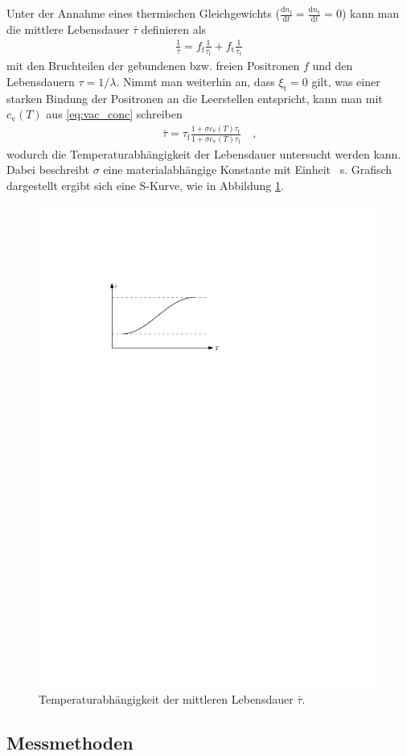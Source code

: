 \documentclass[11pt, a4paper]{article}
\numberwithin{equation}{section}
\begin{document}
Unter der Annahme eines thermischen Gleichgewichts ($\frac{\mathrm{d}n_\mathrm{f}}{\mathrm{d}t} = \frac{\mathrm{d}n_\mathrm{t}}{\mathrm{d}t} = 0$) kann man die mittlere Lebensdauer $\bar\tau$ definieren als
\begin{align}
	\frac{1}{\bar\tau}=f_\mathrm{f}\frac{1}{\tau_\mathrm{f}} + f_\mathrm{t}\frac{1}{\tau_\mathrm{t}}
\end{align}
mit den Bruchteilen der gebundenen bzw. freien Positronen $f$ und den Lebensdauern $\tau = 1/\lambda$.
Nimmt man weiterhin an, dass $\xi_\mathrm{t}=0$ gilt, was einer starken Bindung der Positronen an die Leerstellen entspricht, kann man mit $c_\mathrm{v}(T)$ aus \eqref{eq:vac_conc} schreiben
\begin{align}
	\bar\tau=\tau_\mathrm{f}\frac{1+\sigma c_\mathrm{v}(T)\tau_\mathrm{t}}{1+\sigma c_\mathrm{v}(T)\tau_\mathrm{f}}\quad\text{,}
	\label{eq:mean_lifetime}
\end{align}
wodurch die Temperaturabhängigkeit der Lebensdauer untersucht werden kann.
Dabei beschreibt $\sigma$ eine materialabhängige Konstante mit Einheit \si{\per\second}.
Grafisch dargestellt ergibt sich eine S-Kurve, wie in Abbildung \ref{fig:s_curve_schematic}.
\begin{figure}[htbp]
	\centering
	\includegraphics[width=.6\textwidth]{./figures/s_curve_schematic}
	\caption{Temperaturabhängigkeit der mittleren Lebensdauer $\bar\tau$.}
	\label{fig:s_curve_schematic}
\end{figure}
\subsection{Messmethoden}
\end{document}
